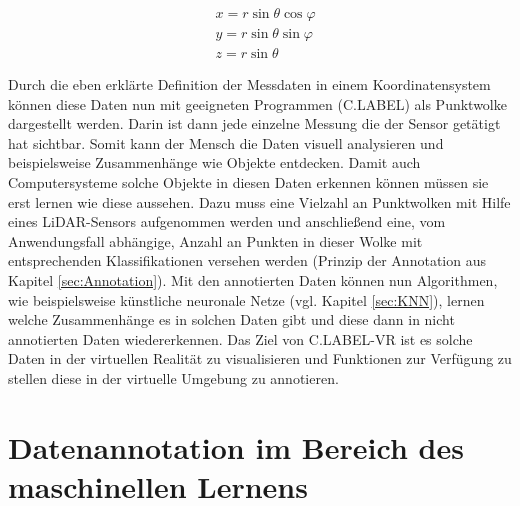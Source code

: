 \begin{subequations}
\begin{align}
        &x = r\sin\theta\cos\varphi \\
		&y = r\sin\theta\sin\varphi \\
		&z = r\sin\theta
\end{align}
\label{eq:SphToKart}
\end{subequations}

Durch die eben erklärte Definition der Messdaten in einem Koordinatensystem können diese Daten nun mit geeigneten Programmen (C.LABEL) als Punktwolke dargestellt werden. Darin ist dann jede einzelne Messung die der Sensor getätigt hat sichtbar. Somit kann der Mensch die Daten visuell analysieren und beispielsweise Zusammenhänge wie Objekte entdecken. Damit auch Computersysteme solche Objekte in diesen Daten erkennen können müssen sie erst lernen wie diese aussehen. Dazu muss eine Vielzahl an Punktwolken mit Hilfe eines LiDAR-Sensors aufgenommen werden und anschließend eine, vom Anwendungsfall abhängige, Anzahl an Punkten in dieser Wolke mit entsprechenden Klassifikationen versehen werden (Prinzip der Annotation aus Kapitel \ref{sec:Annotation}). Mit den annotierten Daten können nun Algorithmen, wie beispielsweise künstliche neuronale Netze (vgl. Kapitel \ref{sec:KNN}), lernen welche Zusammenhänge es in solchen Daten gibt und diese dann in nicht annotierten Daten wiedererkennen. Das Ziel von C.LABEL-VR ist es solche Daten in der virtuellen Realität zu visualisieren und Funktionen zur Verfügung zu stellen diese in der virtuelle Umgebung zu annotieren.

\section{Datenannotation im Bereich des maschinellen Lernens}
\label{sec:AnnotationIntro}

